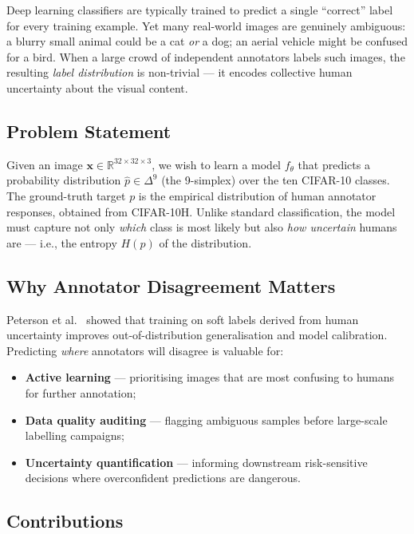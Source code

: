 \documentclass[11pt,a4paper]{article}
\begin{document}
Deep learning classifiers are typically trained to predict a single ``correct''
label for every training example.
Yet many real-world images are genuinely ambiguous: a blurry small animal
could be a cat \emph{or} a dog; an aerial vehicle might be confused for a
bird.
When a large crowd of independent annotators labels such images, the resulting
\emph{label distribution} is non-trivial — it encodes collective human
uncertainty about the visual content.

\subsection{Problem Statement}

Given an image $\mathbf{x} \in \mathbb{R}^{32 \times 32 \times 3}$, we wish
to learn a model $f_\theta$ that predicts a probability distribution
$\hat{p} \in \Delta^9$ (the 9-simplex) over the ten CIFAR-10 classes.
The ground-truth target $p$ is the empirical distribution of human annotator
responses, obtained from CIFAR-10H.
Unlike standard classification, the model must capture not only \emph{which}
class is most likely but also \emph{how uncertain} humans are — i.e., the
entropy $H(p)$ of the distribution.

\subsection{Why Annotator Disagreement Matters}

Peterson et al.~\cite{peterson2019human} showed that training on soft labels
derived from human uncertainty improves out-of-distribution generalisation and
model calibration.
Predicting \emph{where} annotators will disagree is valuable for:
\begin{itemize}[noitemsep]
  \item \textbf{Active learning} — prioritising images that are most confusing
        to humans for further annotation;
  \item \textbf{Data quality auditing} — flagging ambiguous samples before
        large-scale labelling campaigns;
  \item \textbf{Uncertainty quantification} — informing downstream
        risk-sensitive decisions where overconfident predictions are dangerous.
\end{itemize}

\subsection{Contributions}
\end{document}
